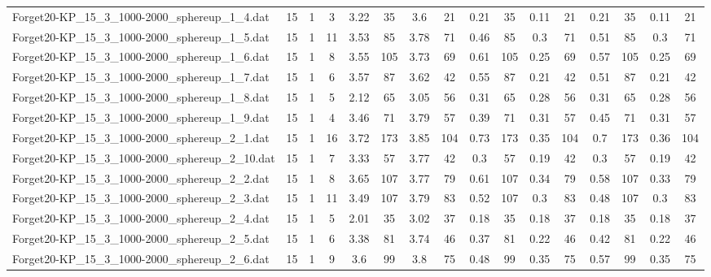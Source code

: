 \begin{sidewaystable}[!ht]
{\begin{tabular}{lccccccccccccccc}
Forget20-KP\_15\_3\_1000-2000\_sphereup\_1\_4.dat & 15 & 1 & 3 & 3.22 & 35 & 3.6 & 21 & 0.21 & 35 &  \textcolor{blue2}{0.11} & 21 & 0.21 & 35 &  \textcolor{blue2}{0.11} & 21 \\
Forget20-KP\_15\_3\_1000-2000\_sphereup\_1\_5.dat & 15 & 1 & 11 & 3.53 & 85 & 3.78 & 71 & 0.46 & 85 &  \textcolor{blue2}{0.3} & 71 & 0.51 & 85 &  \textcolor{blue2}{0.3} & 71 \\
Forget20-KP\_15\_3\_1000-2000\_sphereup\_1\_6.dat & 15 & 1 & 8 & 3.55 & 105 & 3.73 & 69 & 0.61 & 105 &  \textcolor{blue2}{0.25} & 69 & 0.57 & 105 &  \textcolor{blue2}{0.25} & 69 \\
Forget20-KP\_15\_3\_1000-2000\_sphereup\_1\_7.dat & 15 & 1 & 6 & 3.57 & 87 & 3.62 & 42 & 0.55 & 87 &  \textcolor{blue2}{0.21} & 42 & 0.51 & 87 &  \textcolor{blue2}{0.21} & 42 \\
Forget20-KP\_15\_3\_1000-2000\_sphereup\_1\_8.dat & 15 & 1 & 5 & 2.12 & 65 & 3.05 & 56 & 0.31 & 65 &  \textcolor{blue2}{0.28} & 56 & 0.31 & 65 &  \textcolor{blue2}{0.28} & 56 \\
Forget20-KP\_15\_3\_1000-2000\_sphereup\_1\_9.dat & 15 & 1 & 4 & 3.46 & 71 & 3.79 & 57 & 0.39 & 71 & 0.31 & 57 & 0.45 & 71 & 0.31 & 57 \\
Forget20-KP\_15\_3\_1000-2000\_sphereup\_2\_1.dat & 15 & 1 & 16 & 3.72 & 173 & 3.85 & 104 & 0.73 & 173 &  \textcolor{blue2}{0.35} & 104 & 0.7 & 173 & 0.36 & 104 \\
Forget20-KP\_15\_3\_1000-2000\_sphereup\_2\_10.dat & 15 & 1 & 7 & 3.33 & 57 & 3.77 & 42 & 0.3 & 57 &  \textcolor{blue2}{0.19} & 42 & 0.3 & 57 &  \textcolor{blue2}{0.19} & 42 \\
Forget20-KP\_15\_3\_1000-2000\_sphereup\_2\_2.dat & 15 & 1 & 8 & 3.65 & 107 & 3.77 & 79 & 0.61 & 107 & 0.34 & 79 & 0.58 & 107 &  \textcolor{blue2}{0.33} & 79 \\
Forget20-KP\_15\_3\_1000-2000\_sphereup\_2\_3.dat & 15 & 1 & 11 & 3.49 & 107 & 3.79 & 83 & 0.52 & 107 &  \textcolor{blue2}{0.3} & 83 & 0.48 & 107 &  \textcolor{blue2}{0.3} & 83 \\
Forget20-KP\_15\_3\_1000-2000\_sphereup\_2\_4.dat & 15 & 1 & 5 & 2.01 & 35 & 3.02 & 37 &  \textcolor{blue2}{0.18} & 35 &  \textcolor{blue2}{0.18} & 37 &  \textcolor{blue2}{0.18} & 35 &  \textcolor{blue2}{0.18} & 37 \\
Forget20-KP\_15\_3\_1000-2000\_sphereup\_2\_5.dat & 15 & 1 & 6 & 3.38 & 81 & 3.74 & 46 & 0.37 & 81 &  \textcolor{blue2}{0.22} & 46 & 0.42 & 81 &  \textcolor{blue2}{0.22} & 46 \\
Forget20-KP\_15\_3\_1000-2000\_sphereup\_2\_6.dat & 15 & 1 & 9 & 3.6 & 99 & 3.8 & 75 & 0.48 & 99 &  \textcolor{blue2}{0.35} & 75 & 0.57 & 99 &  \textcolor{blue2}{0.35} & 75 \\

\end{tabular}}
\end{sidewaystable}
